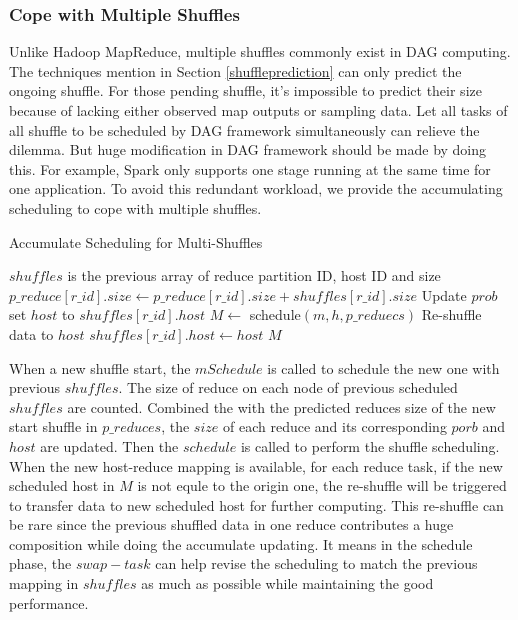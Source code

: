 \subsubsection{Cope with Multiple Shuffles}
Unlike Hadoop MapReduce, multiple shuffles commonly exist in DAG computing. The techniques mention in Section \ref{shuffleprediction} can only predict the ongoing shuffle. For those pending shuffle, it's impossible to predict their size because of lacking either observed map outputs or sampling data. Let all tasks of all shuffle to be scheduled by DAG framework simultaneously can relieve the dilemma. But huge modification in DAG framework should be made by doing this. For example, Spark only supports one stage running at the same time for one application. To avoid this redundant workload, we provide the accumulating scheduling to cope with multiple shuffles.
\begin{minipage}{\linewidth}
\begin{algorithm}[H]
\caption{Accumulate Scheduling for Multi-Shuffles}
\label{mhminheap}
	\begin{algorithmic}[1]
	\small
		\State
		\Comment $shuffles$ is the previous array of reduce partition ID, host ID and size
		\State $p\_reduce\left[r\_id\right].size\gets p\_reduce\left[r\_id\right].size + shuffles\left[r\_id\right].size$
		\State Update $prob$ set $host$ to $shuffles\left[r\_id\right].host$
		\EndIf
		\EndFor
		\State $M\gets$ schedule$\left(m, h, p\_reduecs\right)$
				\State Re-shuffle data to $host$
				\State $shuffles\left[r\_id\right].host\gets host$
				\EndIf
			\EndFor
		\EndFor
		\Return $M$
	\EndProcedure
	\end{algorithmic}
\end{algorithm}
\end{minipage}

When a new shuffle start, the $mSchedule$ is called to schedule the new one with previous $shuffles$. The size of reduce on each node of previous scheduled $shuffles$ are counted. Combined the with the predicted reduces size of the new start shuffle in $p\_reduces$, the $size$ of each reduce and its corresponding $porb$ and $host$ are updated. Then the $schedule$ is called to perform the shuffle scheduling. When the new host-reduce mapping is available, for each reduce task, if the new scheduled host in $M$ is not equle to the origin one, the re-shuffle will be triggered to transfer data to new scheduled host for further computing. This re-shuffle can be rare since the previous shuffled data in one reduce contributes a huge composition while doing the accumulate updating. It means in the schedule phase, the $swap-task$ can help revise the scheduling to match the previous mapping in $shuffles$ as much as possible while maintaining the good performance.